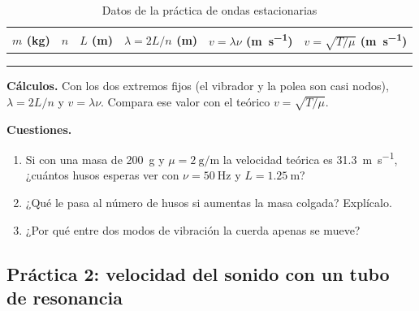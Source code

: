 \begin{table}[H]
    \centering
    \caption{Datos de la práctica de ondas estacionarias}
    \vspace{-5pt}
    \begin{tabular}{@{}C{2cm}C{1.6cm}C{2cm}C{2.4cm}C{2.4cm}C{2.4cm}@{}}
        \toprule
        \textbf{\(m\) (\unit{\kg})} & \textbf{\(n\)} & \textbf{\(L\) (\unit{\m})} & \textbf{\(\lambda = 2L/n\) (\unit{\m})} & \textbf{\(v = \lambda\nu\) (\unit{\m\per\second})} & \textbf{\(v = \sqrt{T/\mu}\) (\unit{\m\per\second})} \\
        \midrule
        \rule{0pt}{18pt} & & & & & \\ \midrule[0.3pt]
        \rule{0pt}{18pt} & & & & & \\ \midrule[0.3pt]
        \rule{0pt}{18pt} & & & & & \\
        \bottomrule
    \end{tabular}
    \label{tab:ond-practica-melde}
\end{table}

\textbf{Cálculos.} Con los dos extremos fijos (el vibrador y la polea son casi nodos), \(\lambda = 2L/n\) y
\(v = \lambda\nu\). Compara ese valor con el teórico \(v = \sqrt{T/\mu}\).

\textbf{Cuestiones.}
\begin{enumerate}[label=\letraminuscula]
    \item Si con una masa de \qty{200}{\g} y \(\mu = \qty{2}{\g\per\m}\) la velocidad teórica es \qty{31.3}{\m\per\second},
    ¿cuántos husos esperas ver con \(\nu = \qty{50}{\hertz}\) y \(L = \qty{1.25}{\m}\)?
    \item ¿Qué le pasa al número de husos si aumentas la masa colgada? Explícalo.
    \item ¿Por qué entre dos modos de vibración la cuerda apenas se mueve?
\end{enumerate}

\subsection{Práctica 2: velocidad del sonido con un tubo de resonancia}\label{subsec:ond-practica-tubo}

